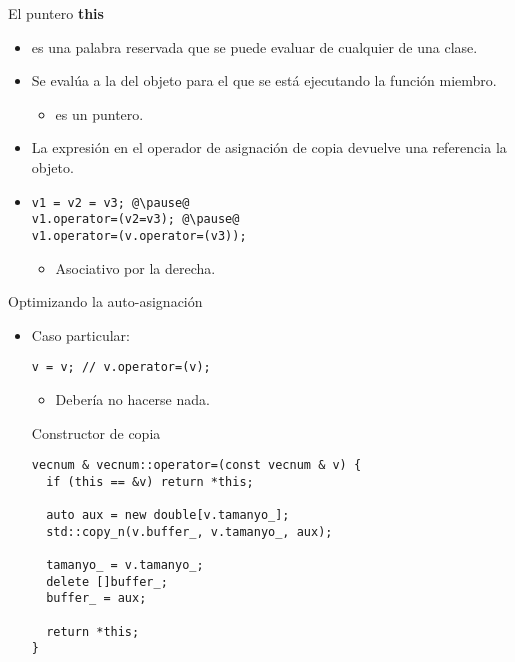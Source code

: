 \begin{frame}[t,fragile]{El puntero \textbf{this}}
\begin{itemize}
  \item {} es una palabra reservada que se puede evaluar
         de cualquier  de una clase.

  \item Se evalúa a la  del objeto para el que se 
        está ejecutando la función miembro.
    \begin{itemize}
      \item {} es un puntero.
    \end{itemize}

  \item La expresión  en el operador de asignación de copia devuelve una referencia la objeto.

  \item {}
\begin{lstlisting}[escapechar=@]
v1 = v2 = v3; @\pause@
v1.operator=(v2=v3); @\pause@
v1.operator=(v.operator=(v3));
\end{lstlisting}
    \begin{itemize}
      \item Asociativo por la derecha.
    \end{itemize}
\end{itemize}
\end{frame}

\begin{frame}[t,fragile]{Optimizando la auto-asignación}
\begin{itemize}
  \item Caso particular: 
\begin{lstlisting}
v = v; // v.operator=(v);
\end{lstlisting}
    \begin{itemize}
      \item Debería no hacerse nada.
    \end{itemize}

\begin{block}{Constructor de copia}
\begin{lstlisting}
vecnum & vecnum::operator=(const vecnum & v) {
  if (this == &v) return *this;
  
  auto aux = new double[v.tamanyo_];
  std::copy_n(v.buffer_, v.tamanyo_, aux);

  tamanyo_ = v.tamanyo_;
  delete []buffer_;
  buffer_ = aux;

  return *this;
}
\end{lstlisting}
\end{block}
\end{itemize}
\end{frame}
